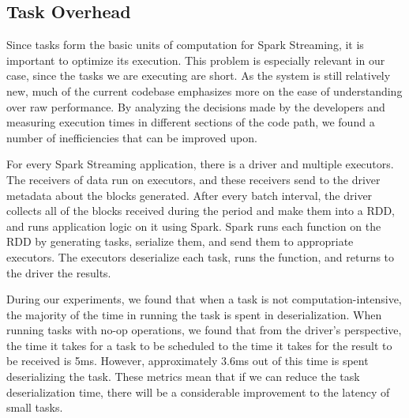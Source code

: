 \subsection{Task Overhead}
Since tasks form the basic units of computation for Spark Streaming, it is important to optimize its execution. This problem is especially relevant in our case, since the tasks we are executing are short. As the system is still relatively new, much of the current codebase emphasizes more on the ease of understanding over raw performance. By analyzing the decisions made by the developers and measuring execution times in different sections of the code path, we found a number of inefficiencies that can be improved upon.

For every Spark Streaming application, there is a driver and multiple executors. The receivers of data run on executors, and these receivers send to the driver metadata about the blocks generated. After every batch interval, the driver collects all of the blocks received during the period and make them into a RDD, and runs application logic on it using Spark. Spark runs each function on the RDD by generating tasks, serialize them, and send them to appropriate executors. The executors deserialize each task, runs the function, and returns to the driver the results.

During our experiments, we found that when a task is not computation-intensive, the majority of the time in running the task is spent in deserialization. When running tasks with no-op operations, we found that from the driver's perspective, the time it takes for a task to be scheduled to the time it takes for the result to be received is 5ms. However, approximately 3.6ms out of this time is spent deserializing the task. These metrics mean that if we can reduce the task deserialization time, there will be a considerable improvement to the latency of small tasks.

